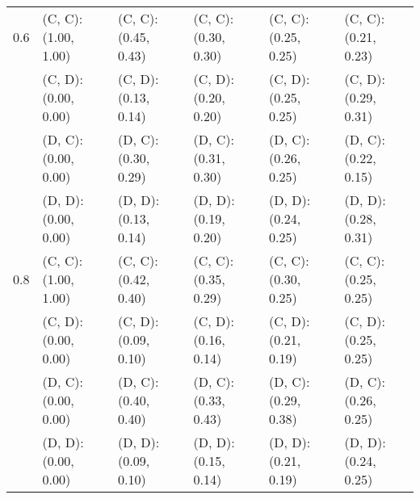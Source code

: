 \begin{tabular}{ l | l l l l l }
\hline 
0.6 & (C, C): (1.00, 1.00) & (C, C): (0.45, 0.43) & (C, C): (0.30, 0.30) & (C, C): (0.25, 0.25) & (C, C): (0.21, 0.23) \\ 
 & (C, D): (0.00, 0.00) & (C, D): (0.13, 0.14) & (C, D): (0.20, 0.20) & (C, D): (0.25, 0.25) & (C, D): (0.29, 0.31) \\ 
 & (D, C): (0.00, 0.00) & (D, C): (0.30, 0.29) & (D, C): (0.31, 0.30) & (D, C): (0.26, 0.25) & (D, C): (0.22, 0.15) \\ 
 & (D, D): (0.00, 0.00) & (D, D): (0.13, 0.14) & (D, D): (0.19, 0.20) & (D, D): (0.24, 0.25) & (D, D): (0.28, 0.31) \\ 
\hline 
0.8 & (C, C): (1.00, 1.00) & (C, C): (0.42, 0.40) & (C, C): (0.35, 0.29) & (C, C): (0.30, 0.25) & (C, C): (0.25, 0.25) \\ 
 & (C, D): (0.00, 0.00) & (C, D): (0.09, 0.10) & (C, D): (0.16, 0.14) & (C, D): (0.21, 0.19) & (C, D): (0.25, 0.25) \\ 
 & (D, C): (0.00, 0.00) & (D, C): (0.40, 0.40) & (D, C): (0.33, 0.43) & (D, C): (0.29, 0.38) & (D, C): (0.26, 0.25) \\ 
 & (D, D): (0.00, 0.00) & (D, D): (0.09, 0.10) & (D, D): (0.15, 0.14) & (D, D): (0.21, 0.19) & (D, D): (0.24, 0.25) \\ 

\end{tabular}



